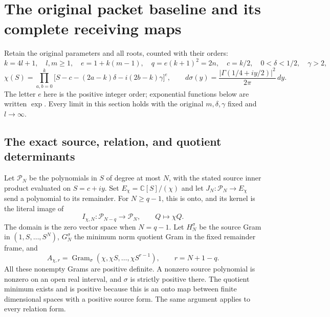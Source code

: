 \documentclass[11pt,a4paper]{article}
\begin{document}

\clearpage

\section{The original packet baseline and its complete receiving maps}
\label{sec:BSL}

Retain the original parameters and all roots, counted with their orders:
\[
 k=4l+1,\quad l,m\geq1,\quad e=1+k(m-1),\quad
 q=e(k+1)^2=2n,\quad c=k/2,\quad
 0<\delta<1/2,\quad\gamma>2,
\]
\[
 \chi(S)=\prod_{a,b=0}^{k}
 \bigl[S-c-(2a-k)\delta-i(2b-k)\gamma\bigr]^e,
 \qquad d\sigma(y)=\frac{|\Gamma(1/4+iy/2)|^2}{2\pi}\,dy.
 \tag{BSL1}
\]
The letter $e$ here is the positive integer order; exponential functions
below are written $\exp$. Every limit in this section holds with the
original $m,\delta,\gamma$ fixed and $l\to\infty$.

\subsection{The exact source, relation, and quotient determinants}
Let $\mathcal P_N$ be the polynomials in $S$ of degree at most $N$,
with the stated source inner product evaluated on $S=c+iy$. Set
$E_\chi=\mathbb C[S]/(\chi)$ and let
$J_N:\mathcal P_N\to E_\chi$ send a polynomial to its remainder.
For $N\geq q-1$, this is onto, and its kernel is the literal image of
\[
 I_{\chi,N}:\mathcal P_{N-q}\longrightarrow\mathcal P_N,
 \qquad Q\longmapsto\chi Q.
 \tag{BSL2}
\]
The domain is the zero vector space when $N=q-1$. Let $H_N^\sigma$
be the source Gram in $(1,S,\ldots,S^N)$, $G_N^\sigma$ the minimum
norm quotient Gram in the fixed remainder frame, and
\[
 A_{\chi,r}=\operatorname{Gram}_{\sigma}
       (\chi,\chi S,\ldots,\chi S^{r-1}),\qquad r=N+1-q.
\]
All these nonempty Grams are positive definite. A nonzero source
polynomial is nonzero on an open real interval, and $\sigma$ is
strictly positive there. The quotient minimum exists and is positive
because this is an onto map between finite dimensional spaces with a
positive source form. The same argument applies to every relation form.
\end{document}

